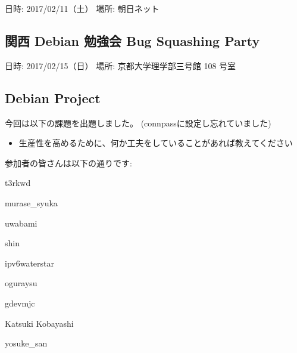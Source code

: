 \documentclass[mingoth,a4paper]{jsarticle}
\begin{document}
日時: 2017/02/11（土）
場所: 朝日ネット

\subsection{関西 Debian 勉強会 Bug Squashing Party}

日時: 2017/02/15（日）
場所: 京都大学理学部三号館 108 号室

\subsection{Debian Project}


今回は以下の課題を出題しました。
(connpassに設定し忘れていました)

\begin{itemize}
\item{生産性を高めるために、何か工夫をしていることがあれば教えてください}
\end{itemize}

参加者の皆さんは以下の通りです:

\begin{prework}{ t3rkwd }
\end{prework}

\begin{prework}{murase\_syuka}
\end{prework}

\begin{prework}{ uwabami }
\end{prework}

\begin{prework}{ shin }
\end{prework}

\begin{prework}{ ipv6waterstar }
\end{prework}

\begin{prework}{ oguraysu }
\end{prework}

\begin{prework}{ gdevmjc }
\end{prework}

\begin{prework}{ Katsuki Kobayashi }
\end{prework}

\begin{prework}{ yosuke\_san }
\end{prework}
\end{document}
